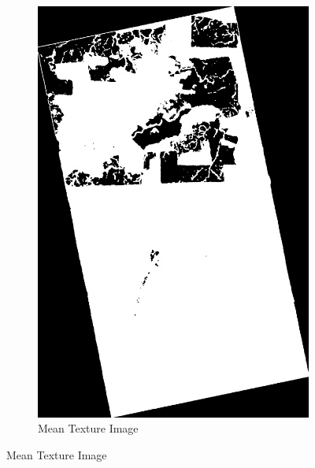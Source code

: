 \begin{figure}[H]
\begin{subfigure}[b]{0.4\linewidth}
    \includegraphics[width=\linewidth]{Chapter4/sum_and_diff_textures/meanimage.png}
     \caption{Mean Texture Image}
  \end{subfigure}
\end{figure}
\newpage
